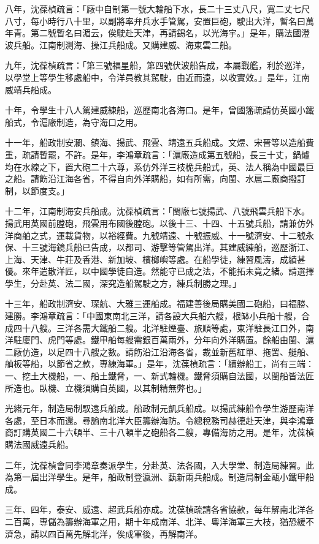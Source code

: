 \begin{pinyinscope}
八年，沈葆楨疏言：「廠中自制第一號大輪船下水，長二十三丈八尺，寬二丈七尺八寸，每小時行八十里，以副將率弁兵水手管駕，安置巨砲，駛出大洋，暫名曰萬年青。第二號暫名曰湄云，俟駛赴天津，再請錫名，以光海宇。」是年，購法國澄波兵船。江南制測海、操江兵船成。又購建威、海東雲二船。

九年，沈葆楨疏言：「第三號福星船，第四號伏波船告成，本屬戰艦，利於巡洋，以學堂上等學生移處船中，令洋員教其駕駛，由近而遠，以收實效。」是年，江南威靖兵船成。

十年，令學生十八人駕建威練船，巡歷南北各海口。是年，曾國籓疏請仿英國小鐵船式，令滬廠制造，為守海口之用。

十一年，船政制安瀾、鎮海、揚武、飛雲、靖遠五兵船成。文煜、宋晉等以造船費重，疏請暫罷，不許。是年，李鴻章疏言：「滬廠造成第五號船，長三十丈，鍋爐均在水線之下，置大砲二十六尊，系仿外洋三枝桅兵船式，英、法人稱為中國最巨之船。請飭沿江海各省，不得自向外洋購船，如有所需，向閩、水扈二廠商撥訂制，以節度支。」

十二年，江南制海安兵船成。沈葆楨疏言：「閩廠七號揚武、八號飛雲兵船下水。揚武用英國前膛砲，飛雲用布國後膛砲。以後十三、十四、十五號兵船，請兼仿外洋商舶之式，運載貨物，以裕經費。九號靖遠、十號振威、十一號濟安、十二號永保、十三號海鏡兵船已告成，以都司、游擊等管駕出洋。其建威練船，巡歷浙江、上海、天津、牛莊及香港、新加坡、檳榔嶼等處。在船學徒，練習風濤，成績甚優。來年遣散洋匠，以中國學徒自造。然能守已成之法，不能拓未竟之緒。請選擇學生，分赴英、法二國，深究造船駕駛之方，練兵制勝之理。」

十三年，船政制濟安、琛航、大雅三運船成。福建善後局購美國二砲船，曰福勝、建勝。李鴻章疏言：「中國東南北三洋，請各設大兵船六艘，根缽小兵船十艘，合成四十八艘。三洋各需大鐵船二艘。北洋駐煙臺、旅順等處，東洋駐長江口外，南洋駐廈門、虎門等處。鐵甲船每艘需銀百萬兩外，分年向外洋購置。餘船由閩、滬二廠仿造，以足四十八艘之數。請飭沿江沿海各省，裁並新舊紅單、拖罟、艇船、舢板等船，以節省之款，專練海軍。」是年，沈葆楨疏言：「續辦船工，尚有三端：一、挖土大機船，一、船土鐵脅，一、新式輪機。鐵脅須購自法國，以閩船皆法匠所造也。臥機、立機須購自英國，以其制精無弊也。」

光緒元年，制造局制馭遠兵船成。船政制元凱兵船成。以揚武練船令學生游歷南洋各處，至日本而還。尋諭南北洋大臣籌辦海防。令總稅務司赫德赴天津，與李鴻章商訂購英國二十六頓半、三十八頓半之砲船各二艘，專備海防之用。是年，沈葆楨購法國威遠兵船。

二年，沈葆楨會同李鴻章奏派學生，分赴英、法各國，入大學堂、制造局練習。此為第一屆出洋學生。是年，船政制登瀛洲、蓺新兩兵船成。制造局制金甌小鐵甲船成。

三年、四年，泰安、威遠、超武兵船亦成。沈葆楨疏請各省協款，每年解南北洋各二百萬，專儲為籌辦海軍之用，期十年成南洋、北洋、粵洋海軍三大枝，猶恐緩不濟急，請以四百萬先解北洋，俟成軍後，再解南洋。


\end{pinyinscope}
